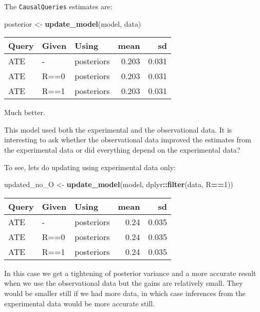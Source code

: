 \documentclass[
  12pt,
]{book}
\newenvironment{Shaded}{\begin{snugshade}}{\end{snugshade}}
\newcommand{\DecValTok}[1]{\textcolor[rgb]{0.00,0.00,0.81}{#1}}
\newcommand{\KeywordTok}[1]{\textcolor[rgb]{0.13,0.29,0.53}{\textbf{#1}}}
\newcommand{\NormalTok}[1]{#1}
\newcommand{\OperatorTok}[1]{\textcolor[rgb]{0.81,0.36,0.00}{\textbf{#1}}}
\newcommand{\StringTok}[1]{\textcolor[rgb]{0.31,0.60,0.02}{#1}}
\begin{document}
The \texttt{CausalQueries} estimates are:

\begin{Shaded}
\begin{Highlighting}[]
\NormalTok{posterior <-}\StringTok{ }\KeywordTok{update_model}\NormalTok{(model, data)}
\end{Highlighting}
\end{Shaded}

\begin{tabular}{l|l|l|r|r}
\hline
Query & Given & Using & mean & sd\\
\hline
ATE & - & posteriors & 0.203 & 0.031\\
\hline
ATE & R==0 & posteriors & 0.203 & 0.031\\
\hline
ATE & R==1 & posteriors & 0.203 & 0.031\\
\hline
\end{tabular}

Much better.

This model used both the experimental and the observational data. It is interesting to ask whether the observational data improved the estimates from the experimental data or did everything depend on the experimental data?

To see, lets do updating using experimental data only:

\begin{Shaded}
\begin{Highlighting}[]
\NormalTok{updated_no_O <-}\StringTok{ }\KeywordTok{update_model}\NormalTok{(model, dplyr}\OperatorTok{::}\KeywordTok{filter}\NormalTok{(data, R}\OperatorTok{==}\DecValTok{1}\NormalTok{))}
\end{Highlighting}
\end{Shaded}

\begin{tabular}{l|l|l|r|r}
\hline
Query & Given & Using & mean & sd\\
\hline
ATE & - & posteriors & 0.24 & 0.035\\
\hline
ATE & R==0 & posteriors & 0.24 & 0.035\\
\hline
ATE & R==1 & posteriors & 0.24 & 0.035\\
\hline
\end{tabular}

In this case we get a tightening of posterior variance and a more accurate result when we use the observational data but the gains are relatively small. They would be smaller still if we had more data, in which case inferences from the experimental data would be more accurate still.
\end{document}
